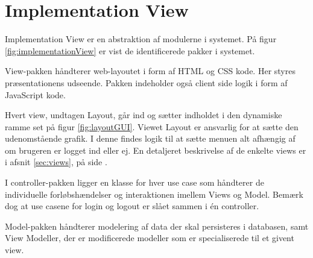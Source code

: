 \section{Implementation View}
Implementation View er en abstraktion af modulerne i systemet. På figur \ref{fig:implementationView} er vist de identificerede pakker i systemet.


View-pakken håndterer web-layoutet i form af HTML og CSS kode. Her styres præsentationens udseende. Pakken indeholder også client side logik i form af JavaScript kode.

Hvert view, undtagen Layout, går ind og sætter indholdet i den dynamiske ramme set på figur \ref{fig:layoutGUI}. Viewet Layout er ansvarlig for at sætte den udenomstående grafik. I denne findes logik til at sætte menuen alt afhængig af om brugeren er logget ind eller ej. En detaljeret beskrivelse af de enkelte views er i afsnit \ref{sec:views}, på side \pageref{sec:views}.


I controller-pakken ligger en klasse for hver use case som håndterer de individuelle forløbshændelser og interaktionen imellem Views og Model. Bemærk dog at use casene for login og logout er slået sammen i én controller. 

Model-pakken håndterer modelering af data der skal persisteres i databasen, samt View Modeller, der er modificerede modeller som er specialiserede til et givent view.